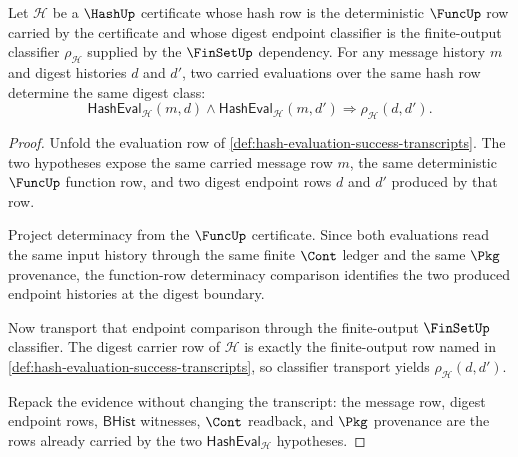 \begin{theorem}
\label{thm:hash-evaluation-transcript-determinacy}
Let $\mathcal H$ be a $\HashUp$ certificate whose hash row is the deterministic $\FuncUp$ row carried by the certificate and whose digest endpoint classifier is the finite-output classifier $\rho_{\mathcal H}$ supplied by the $\FinSetUp$ dependency. For any message history $m$ and digest histories $d$ and $d'$, two carried evaluations over the same hash row determine the same digest class:
$$
\mathsf{HashEval}_{\mathcal H}(m,d)\land
\mathsf{HashEval}_{\mathcal H}(m,d')
\Longrightarrow
\rho_{\mathcal H}(d,d').
$$
\end{theorem}
\begin{proof}
Unfold the evaluation row of \autoref{def:hash-evaluation-success-transcripts}. The two hypotheses expose the same carried message row $m$, the same deterministic $\FuncUp$ function row, and two digest endpoint rows $d$ and $d'$ produced by that row.

Project determinacy from the $\FuncUp$ certificate. Since both evaluations read the same input history through the same finite $\Cont$ ledger and the same $\Pkg$ provenance, the function-row determinacy comparison identifies the two produced endpoint histories at the digest boundary.

Now transport that endpoint comparison through the finite-output $\FinSetUp$ classifier. The digest carrier row of $\mathcal H$ is exactly the finite-output row named in \autoref{def:hash-evaluation-success-transcripts}, so classifier transport yields $\rho_{\mathcal H}(d,d')$.

Repack the evidence without changing the transcript: the message row, digest endpoint rows, $\mathsf{BHist}$ witnesses, $\Cont$ readback, and $\Pkg$ provenance are the rows already carried by the two $\mathsf{HashEval}_{\mathcal H}$ hypotheses.
\end{proof}

